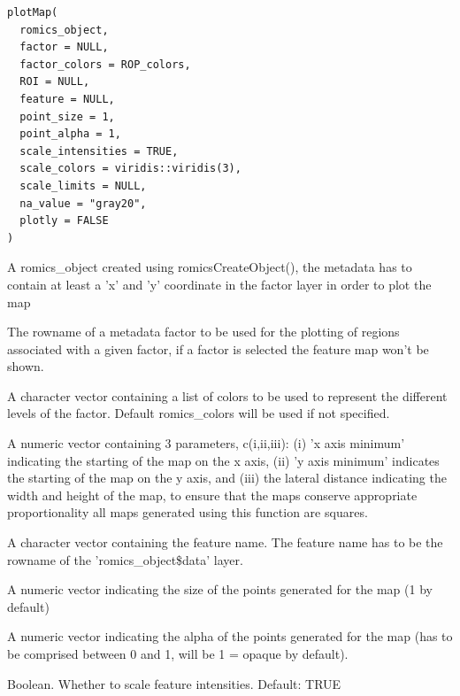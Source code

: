 \documentclass[a4paper]{book}
\begin{document}
%
\begin{Usage}
\begin{verbatim}
plotMap(
  romics_object,
  factor = NULL,
  factor_colors = ROP_colors,
  ROI = NULL,
  feature = NULL,
  point_size = 1,
  point_alpha = 1,
  scale_intensities = TRUE,
  scale_colors = viridis::viridis(3),
  scale_limits = NULL,
  na_value = "gray20",
  plotly = FALSE
)
\end{verbatim}
\end{Usage}
%
\begin{Arguments}
\begin{ldescription}
\item[\code{romics\_object}] A romics\_object created using romicsCreateObject(), the metadata has to contain at least a 'x' and 'y' coordinate in the factor layer in order to plot the map

\item[\code{factor}] The rowname of a metadata factor to be used for the plotting of regions associated with a given factor, if a factor is selected the feature map won't be shown.

\item[\code{factor\_colors}] A character vector containing a list of colors to be used to represent the different levels of the factor. Default romics\_colors will be used if not specified.

\item[\code{ROI}] A numeric vector containing 3 parameters, c(i,ii,iii): (i) 'x axis minimum' indicating the starting of the map on the x axis, (ii) 'y axis minimum' indicates the starting of the map on the y axis, and (iii) the lateral distance indicating the width and height of the map, to ensure that the maps conserve appropriate proportionality all maps generated using this function are squares.

\item[\code{feature}] A character vector containing the feature name. The feature name has to be the rowname of the 'romics\_object\$data' layer.

\item[\code{point\_size}] A numeric vector indicating the size of the points generated for the map (1 by default)

\item[\code{point\_alpha}] A numeric vector indicating the alpha of the points generated for the map (has to be comprised between 0 and 1, will be 1 = opaque by default).

\item[\code{scale\_intensities}] Boolean. Whether to scale feature intensities. Default: TRUE


\end{ldescription}
\end{Arguments}
\end{document}
